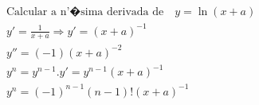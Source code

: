 \begin{ex}
\begin{align}
&\text{Calcular a n'�sima derivada de}\quad y=\ln{(x+a)}\nonumber\\
&y'=\frac{1}{x+a} \Rightarrow y'=(x+a)^{-1}\nonumber\\
&y''=(-1)(x+a)^{-2}\nonumber\\
&y^{n}=y^{n-1}.y'=y^{n-1}(x+a)^{-1}\nonumber\\
&y^{n}=(-1)^{n-1}(n-1)!(x+a)^{-1}\nonumber
\end{align}
\end{ex}